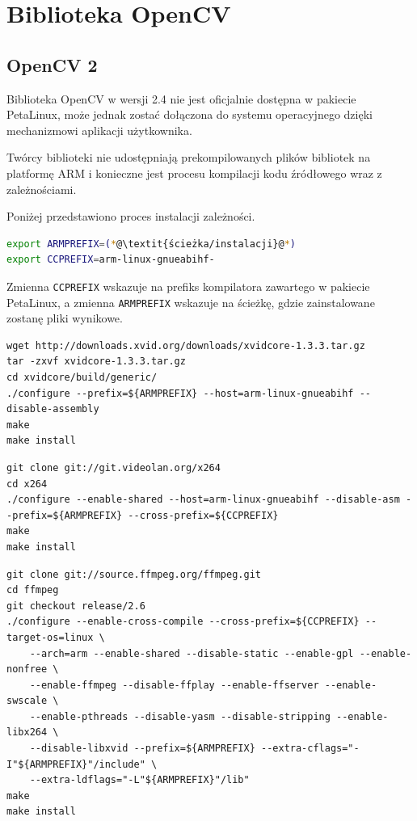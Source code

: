 \section{Biblioteka OpenCV}
\label{sec:opencv-config}
\subsection{OpenCV 2}
Biblioteka OpenCV w wersji 2.4 nie jest oficjalnie dostępna w pakiecie PetaLinux, może jednak zostać dołączona do systemu operacyjnego dzięki mechanizmowi aplikacji użytkownika.

Twórcy biblioteki nie udostępniają prekompilowanych plików bibliotek na platformę ARM i konieczne jest procesu kompilacji kodu źródłowego wraz z zależnościami.

Poniżej przedstawiono proces instalacji zależności.

\begin{lstlisting}[breaklines=true, language=Bash, caption=Definicja zmiennych środowiskowych.]
export ARMPREFIX=(*@\textit{ścieżka/instalacji}@*)
export CCPREFIX=arm-linux-gnueabihf-
\end{lstlisting}
Zmienna \texttt{CCPREFIX} wskazuje na prefiks kompilatora zawartego w pakiecie PetaLinux, a zmienna \texttt{ARMPREFIX} wskazuje na ścieżkę, gdzie zainstalowane zostanę pliki wynikowe.

\begin{lstlisting}[breaklines=true, caption=Kompilacja biblioteki \textit{xVideo}.]
wget http://downloads.xvid.org/downloads/xvidcore-1.3.3.tar.gz
tar -zxvf xvidcore-1.3.3.tar.gz
cd xvidcore/build/generic/
./configure --prefix=${ARMPREFIX} --host=arm-linux-gnueabihf --disable-assembly
make
make install
\end{lstlisting}

\begin{lstlisting}[breaklines=true, caption=Kompilacja biblioteki \textit{x264}.]
git clone git://git.videolan.org/x264
cd x264
./configure --enable-shared --host=arm-linux-gnueabihf --disable-asm --prefix=${ARMPREFIX} --cross-prefix=${CCPREFIX}
make
make install
\end{lstlisting}

\begin{lstlisting}[breaklines=true, caption=Kompilacja biblioteki \textit{ffmpeg}.]
git clone git://source.ffmpeg.org/ffmpeg.git
cd ffmpeg
git checkout release/2.6
./configure --enable-cross-compile --cross-prefix=${CCPREFIX} --target-os=linux \
	--arch=arm --enable-shared --disable-static --enable-gpl --enable-nonfree \
	--enable-ffmpeg --disable-ffplay --enable-ffserver --enable-swscale \
	--enable-pthreads --disable-yasm --disable-stripping --enable-libx264 \
	--disable-libxvid --prefix=${ARMPREFIX} --extra-cflags="-I"${ARMPREFIX}"/include" \
	--extra-ldflags="-L"${ARMPREFIX}"/lib"
make
make install
\end{lstlisting}

